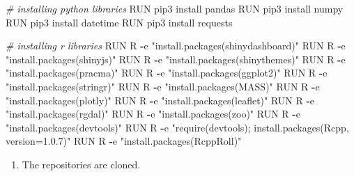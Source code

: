 \documentclass[
  a4paper]{article}
\newenvironment{Shaded}{\begin{snugshade}}{\end{snugshade}}
\newcommand{\CommentTok}[1]{\textcolor[rgb]{0.56,0.35,0.01}{\textit{#1}}}
\newcommand{\NormalTok}[1]{#1}
\newcommand{\OperatorTok}[1]{\textcolor[rgb]{0.81,0.36,0.00}{\textbf{#1}}}
\newcommand{\StringTok}[1]{\textcolor[rgb]{0.31,0.60,0.02}{#1}}
\providecommand{\tightlist}{%
  \setlength{\itemsep}{0pt}\setlength{\parskip}{0pt}}
\begin{document}
\begin{Shaded}
\begin{Highlighting}[]
\CommentTok{\# installing python libraries}
\NormalTok{RUN pip3 install pandas}
\NormalTok{RUN pip3 install numpy}
\NormalTok{RUN pip3 install datetime}
\NormalTok{RUN pip3 install requests}

\CommentTok{\# installing r libraries}
\NormalTok{RUN R }\OperatorTok{{-}}\NormalTok{e }\StringTok{"install.packages(\textquotesingle{}shinydashboard\textquotesingle{})"}
\NormalTok{RUN R }\OperatorTok{{-}}\NormalTok{e }\StringTok{"install.packages(\textquotesingle{}shinyjs\textquotesingle{})"}
\NormalTok{RUN R }\OperatorTok{{-}}\NormalTok{e }\StringTok{"install.packages(\textquotesingle{}shinythemes\textquotesingle{})"}
\NormalTok{RUN R }\OperatorTok{{-}}\NormalTok{e }\StringTok{"install.packages(\textquotesingle{}pracma\textquotesingle{})"}
\NormalTok{RUN R }\OperatorTok{{-}}\NormalTok{e }\StringTok{"install.packages(\textquotesingle{}ggplot2\textquotesingle{})"}
\NormalTok{RUN R }\OperatorTok{{-}}\NormalTok{e }\StringTok{"install.packages(\textquotesingle{}stringr\textquotesingle{})"}
\NormalTok{RUN R }\OperatorTok{{-}}\NormalTok{e }\StringTok{"install.packages(\textquotesingle{}MASS\textquotesingle{})"}
\NormalTok{RUN R }\OperatorTok{{-}}\NormalTok{e }\StringTok{"install.packages(\textquotesingle{}plotly\textquotesingle{})"}
\NormalTok{RUN R }\OperatorTok{{-}}\NormalTok{e }\StringTok{"install.packages(\textquotesingle{}leaflet\textquotesingle{})"}
\NormalTok{RUN R }\OperatorTok{{-}}\NormalTok{e }\StringTok{"install.packages(\textquotesingle{}rgdal\textquotesingle{})"}
\NormalTok{RUN R }\OperatorTok{{-}}\NormalTok{e }\StringTok{"install.packages(\textquotesingle{}zoo\textquotesingle{})"}
\NormalTok{RUN R }\OperatorTok{{-}}\NormalTok{e }\StringTok{"install.packages(\textquotesingle{}devtools\textquotesingle{})"}
\NormalTok{RUN R }\OperatorTok{{-}}\NormalTok{e }\StringTok{"require(devtools); install.packages(\textquotesingle{}Rcpp\textquotesingle{}, version=\textquotesingle{}1.0.7\textquotesingle{})"}
\NormalTok{RUN R }\OperatorTok{{-}}\NormalTok{e }\StringTok{"install.packages(\textquotesingle{}RcppRoll\textquotesingle{})"}
\end{Highlighting}
\end{Shaded}

\normalsize

\begin{enumerate}
\def\labelenumi{\arabic{enumi}.}
\setcounter{enumi}{3}
\tightlist
\item
  The repositories are cloned.
\end{enumerate}
\end{document}
